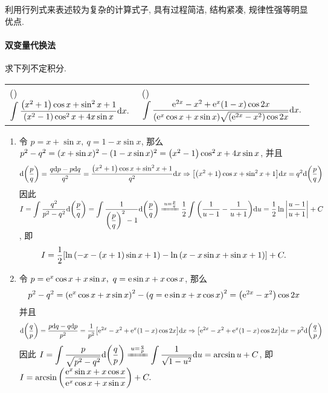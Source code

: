 利用行列式来表述较为复杂的计算式子, 具有过程简洁, 结构紧凑, 规律性强等明显优点.

\paragraph{双变量代换法}

\begin{example}
    求下列不定积分.
    \setcounter{magicrownumbers}{0}
    \begin{table}[H]
        \centering
        \begin{tabular}{l | l}
            (\rownumber{}) $\displaystyle \int\dfrac{\qty(x^2+1)\cos x+\sin^2 x+1}{\qty(x^2-1)\cos^2x+4x\sin x}\dd x.$ & (\rownumber{}) $\displaystyle \int\dfrac{\mathrm{e}^{2x}-x^2+\mathrm{e}^x(1-x)\cos2x}{\qty(\mathrm{e}^x\cos x+x\sin x)\sqrt{\qty(\mathrm{e}^{2x}-x^2)\cos 2x}}\dd x.$
        \end{tabular}
    \end{table}
\end{example}
\begin{solution}
    \begin{enumerate}[label=(\arabic{*})]
        \item 令 $p=x+\sin x,~q=1-x\sin x$, 那么 $p^2-q^2=(x+\sin x)^2-(1-x\sin x)^2=\qty(x^2-1)\cos^2x+4x\sin x$, 并且
              $$\dd\qty(\dfrac{p}{q})=\dfrac{q\dd p-p\dd q}{q^2}=\dfrac{\qty(x^2+1)\cos x+\sin ^2x+1}{q^2}\dd x\Rightarrow \qty[\qty(x^2+1)\cos x+\sin ^2x+1]\dd x=q^2\dd \qty(\dfrac{p}{q})$$
              因此 $I=\displaystyle\int\dfrac{q^2}{p^2-q^2}\dd \qty(\dfrac{p}{q})=\int\dfrac{1}{\qty(\dfrac{p}{q})^2-1}\dd \qty(\dfrac{p}{q})\xlongequal{u=\frac{p}{q}}\dfrac{1}{2}\int\qty(\dfrac{1}{u-1}-\dfrac{1}{u+1})\dd u=\dfrac{1}{2}\ln\qty|\dfrac{u-1}{u+1}|+C$,
              即 $$I=\dfrac{1}{2}\qty[\ln\qty(-x-(x+1)\sin x+1)-\ln\qty(x-x\sin x+\sin x+1)]+C.$$
        \item 令 $p=\mathrm{e}^x\cos x+x\sin x,~q=\mathrm{e}\sin x+x\cos x$, 那么 $$p^2-q^2=\qty(\mathrm{e}^x\cos x+x\sin x)^2-\qty(q=\mathrm{e}\sin x+x\cos x)^2=\qty(\mathrm{e}^{2x}-x^2)\cos 2x$$
              并且
              $$\dd \qty(\dfrac{q}{p})=\dfrac{p\dd q-q\dd p}{p^2}=\dfrac{1}{p^2}\qty[\mathrm{e}^{2x}-x^2+\mathrm{e}^x(1-x)\cos2x]\dd x\Rightarrow \qty[\mathrm{e}^{2x}-x^2+\mathrm{e}^x(1-x)\cos2x]\dd x=p^2\dd \qty(\dfrac{q}{p})$$
              因此 $\displaystyle I=\int\dfrac{p}{\sqrt{p^2-q^2}}\dd \qty(\dfrac{q}{p})\xlongequal{u=\frac{q}{p}}\int\dfrac{1}{\sqrt{1-u^2}}\dd u=\arcsin u+C$, 即
              $\displaystyle I=\arcsin\qty(\dfrac{\mathrm{e}^x\sin x+x\cos x}{\mathrm{e}^x\cos x+x\sin x})+C.$
    \end{enumerate}
\end{solution}